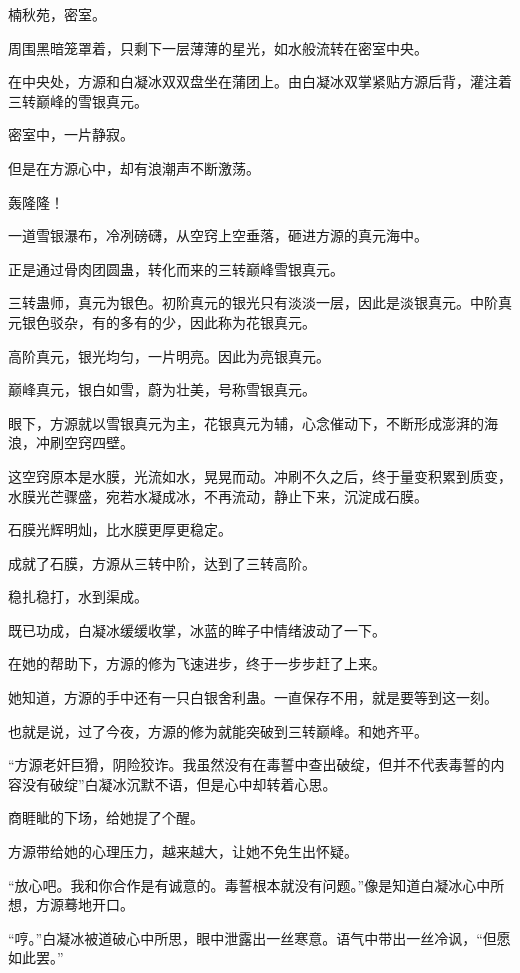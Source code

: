 
\begin{this_body}

楠秋苑，密室。

周围黑暗笼罩着，只剩下一层薄薄的星光，如水般流转在密室中央。

在中央处，方源和白凝冰双双盘坐在蒲团上。由白凝冰双掌紧贴方源后背，灌注着三转巅峰的雪银真元。

密室中，一片静寂。

但是在方源心中，却有浪潮声不断激荡。

轰隆隆！

一道雪银瀑布，冷冽磅礴，从空窍上空垂落，砸进方源的真元海中。

正是通过骨肉团圆蛊，转化而来的三转巅峰雪银真元。

三转蛊师，真元为银色。初阶真元的银光只有淡淡一层，因此是淡银真元。中阶真元银色驳杂，有的多有的少，因此称为花银真元。

高阶真元，银光均匀，一片明亮。因此为亮银真元。

巅峰真元，银白如雪，蔚为壮美，号称雪银真元。

眼下，方源就以雪银真元为主，花银真元为辅，心念催动下，不断形成澎湃的海浪，冲刷空窍四壁。

这空窍原本是水膜，光流如水，晃晃而动。冲刷不久之后，终于量变积累到质变，水膜光芒骤盛，宛若水凝成冰，不再流动，静止下来，沉淀成石膜。

石膜光辉明灿，比水膜更厚更稳定。

成就了石膜，方源从三转中阶，达到了三转高阶。

稳扎稳打，水到渠成。

既已功成，白凝冰缓缓收掌，冰蓝的眸子中情绪波动了一下。

在她的帮助下，方源的修为飞速进步，终于一步步赶了上来。

她知道，方源的手中还有一只白银舍利蛊。一直保存不用，就是要等到这一刻。

也就是说，过了今夜，方源的修为就能突破到三转巅峰。和她齐平。

“方源老奸巨猾，阴险狡诈。我虽然没有在毒誓中查出破绽，但并不代表毒誓的内容没有破绽”白凝冰沉默不语，但是心中却转着心思。

商睚眦的下场，给她提了个醒。

方源带给她的心理压力，越来越大，让她不免生出怀疑。

“放心吧。我和你合作是有诚意的。毒誓根本就没有问题。”像是知道白凝冰心中所想，方源蓦地开口。

“哼。”白凝冰被道破心中所思，眼中泄露出一丝寒意。语气中带出一丝冷讽，“但愿如此罢。”


\end{this_body}
